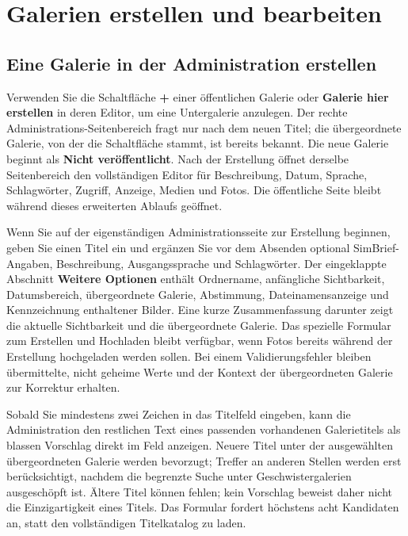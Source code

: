 \documentclass[11pt,a4paper]{article}
\newcommand{\ui}[1]{\textbf{#1}}
\begin{document}
\section{Galerien erstellen und bearbeiten}
\label{sec:create-edit-gallery}

\subsection{Eine Galerie in der Administration erstellen}

Verwenden Sie die Schaltfläche \ui{+} einer öffentlichen Galerie oder
\ui{Galerie hier erstellen} in deren Editor, um eine Untergalerie anzulegen. Der
rechte Administrations-Seitenbereich fragt nur nach dem neuen Titel; die
übergeordnete Galerie, von der die Schaltfläche stammt, ist bereits bekannt. Die
neue Galerie beginnt als \ui{Nicht veröffentlicht}. Nach der Erstellung öffnet
derselbe Seitenbereich den vollständigen Editor für Beschreibung, Datum,
Sprache, Schlagwörter, Zugriff, Anzeige, Medien und Fotos. Die öffentliche Seite
bleibt während dieses erweiterten Ablaufs geöffnet.

Wenn Sie auf der eigenständigen Administrationsseite zur Erstellung beginnen,
geben Sie einen Titel ein und ergänzen Sie vor dem Absenden optional
SimBrief-Angaben, Beschreibung, Ausgangssprache und Schlagwörter. Der
eingeklappte Abschnitt \ui{Weitere Optionen} enthält Ordnername, anfängliche
Sichtbarkeit, Datumsbereich, übergeordnete Galerie, Abstimmung,
Dateinamensanzeige und Kennzeichnung enthaltener Bilder. Eine kurze
Zusammenfassung darunter zeigt die aktuelle Sichtbarkeit und die übergeordnete
Galerie. Das spezielle Formular zum Erstellen und Hochladen bleibt verfügbar,
wenn Fotos bereits während der Erstellung hochgeladen werden sollen. Bei einem
Validierungsfehler bleiben übermittelte, nicht geheime Werte und der Kontext der
übergeordneten Galerie zur Korrektur erhalten.

Sobald Sie mindestens zwei Zeichen in das Titelfeld eingeben, kann die
Administration den restlichen Text eines passenden vorhandenen Galerietitels als
blassen Vorschlag direkt im Feld anzeigen. Neuere Titel unter der ausgewählten
übergeordneten Galerie werden bevorzugt; Treffer an anderen Stellen werden erst
berücksichtigt, nachdem die begrenzte Suche unter Geschwistergalerien
ausgeschöpft ist. Ältere Titel können fehlen; kein Vorschlag beweist daher nicht
die Einzigartigkeit eines Titels. Das Formular fordert höchstens acht Kandidaten
an, statt den vollständigen Titelkatalog zu laden.
\end{document}
